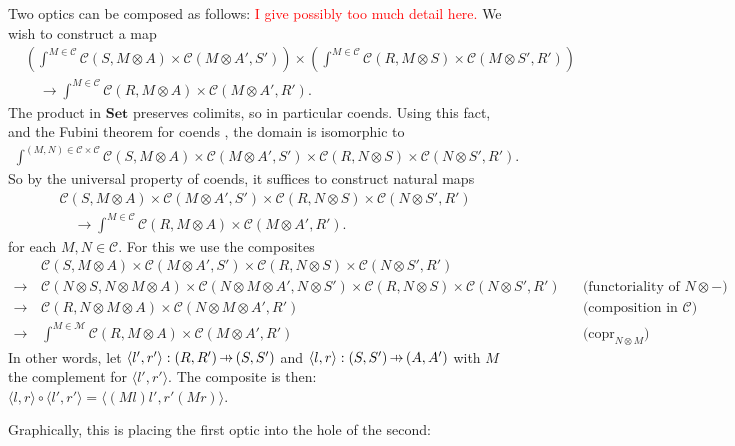 \documentclass[11pt,a4paper]{article}
\theoremstyle{plain}
\theoremstyle{definition}
\newcommand{\C}{\mathscr{C}}
\newcommand{\M}{\mathscr{M}}
\newcommand{\Set}{\mathbf{Set}}
\DeclareMathOperator{\copr}{copr}
\newcommand{\hto}{\ensuremath{\,\mathaccent\shortmid\rightarrow\,}}
\newcommand{\todo}[1]{\textcolor{red}{\small #1}}
\begin{document}
Two optics can be composed as follows: \todo{I give possibly too much detail here.} We wish to construct a map
\begin{align*}
&\left(\int^{M \in \C} \C(S, M \otimes A) \times \C(M \otimes A', S')\right) \times \left(\int^{M \in \C} \C(R, M \otimes S) \times \C(M \otimes S', R')\right) \\ &
 \quad \to \int^{M \in \C} \C(R, M \otimes A) \times \C(M \otimes A', R').
\end{align*}
The product in $\Set$ preserves colimits, so in particular coends. Using this fact, and the Fubini theorem for coends \cite[Remark 1.9]{CoendCofriend}, the domain is isomorphic to
\begin{align*}
\int^{(M, N) \in \C \times \C} \C(S, M \otimes A) \times \C(M \otimes A', S') \times \C(R, N \otimes S) \times \C(N \otimes S', R').
\end{align*}
So by the universal property of coends, it suffices to construct natural maps 
\begin{align*}
& \C(S, M \otimes A) \times \C(M \otimes A', S') \times \C(R, N \otimes S) \times \C(N \otimes S', R') \\ &
 \quad \to \int^{M \in \C} \C(R, M \otimes A) \times \C(M \otimes A', R').
\end{align*}
for each $M, N \in \C$. For this we use the composites
\begin{align*}
&\C(S, M \otimes A) \times \C(M \otimes A', S') \times \C(R, N \otimes S) \times \C(N \otimes S', R')\\
\to \,& \C(N \otimes S, N \otimes M \otimes A) \times \C(N \otimes M \otimes A', N \otimes S') \times \C(R, N \otimes S) \times \C(N \otimes S', R') && \text{(functoriality of $N \otimes  -$)} \\
\to \,& \C(R, N \otimes  M \otimes A) \times \C(N \otimes M \otimes A', R') && \text{(composition in $\C$)} \\
\to \,&\int^{M \in \M} \C(R, M \otimes A) \times \C(M \otimes A', R') && \text{($\copr_{N \otimes M}$)}
\end{align*}
In other words, let $\langle l', r' \rangle : (R, R') \hto (S, S')$ and $\langle l, r \rangle : (S, S') \hto (A, A')$ with $M$ the complement for $\langle l', r' \rangle$. The composite is then: $\langle l, r \rangle \circ \langle l', r' \rangle = \langle (M l)l', r'(Mr)\rangle$. 

Graphically, this is placing the first optic into the hole of the second:
\begin{center}

\qquad\raisebox{1.5cm}{$\circ$}\qquad
 \\
\raisebox{1.5cm}{$:=$}\qquad

\end{center}
\end{document}
